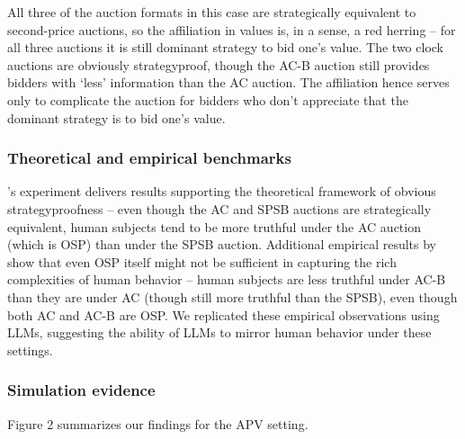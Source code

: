 \documentclass{article} %
\begin{document}
All three of the auction formats in this case are strategically equivalent to second-price auctions, so the affiliation in values is, in a sense, a red herring -- for all three auctions it is still dominant strategy to bid one's value. The two clock auctions are obviously strategyproof, though the AC-B auction still provides bidders with `less' information than the AC auction. The affiliation hence serves only to complicate the auction for bidders who don't appreciate that the dominant strategy is to bid one's value. 

\subsubsection{Theoretical and empirical benchmarks}
\citet{li2017obviously}'s experiment delivers results supporting the theoretical framework of obvious strategyproofness -- even though the AC and SPSB auctions are strategically equivalent, human subjects tend to be more truthful under the AC auction (which is OSP) than under the SPSB auction. Additional empirical results by \citet{breitmoser2022obviousness} show that even OSP itself might not be sufficient in capturing the rich complexities of human behavior -- human subjects are less truthful under AC-B than they are under AC (though still more truthful than the SPSB), even though both AC and AC-B are OSP. We replicated these empirical observations using LLMs, suggesting the ability of LLMs to mirror human behavior under these settings.


\subsubsection{Simulation evidence}
Figure 2 summarizes our findings for the APV setting. 
\end{document}
